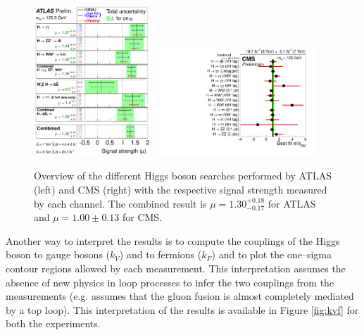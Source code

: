 \begin{figure}
        \centering
	\includegraphics[width=0.39\textwidth]{1_Introduction_Th_and_Exp/pics/fig_01.pdf}
	\includegraphics[width=0.54\textwidth]{1_Introduction_Th_and_Exp/pics/sqr_mlz_ccc_mH125.pdf}
       \caption{Overview of the different Higgs boson searches performed by ATLAS (left) and CMS (right) with the respective signal strength measured by each channel. The combined result is $\mu = 1.30^{+0.18}_{-0.17}$ for ATLAS and $\mu = 1.00 \pm 0.13$ for CMS.}
       \label{fig:combination}
\end{figure}

Another way to interpret the results is to compute the couplings of the Higgs boson to gauge bosons ($k_V$) and to fermions ($k_F$) and to plot the one--sigma contour regions allowed by each measurement. This interpretation assumes the absence of new physics in loop processes to infer the two couplings from the measurements (e.g. assumes that the gluon fusion is almost completely mediated by a top loop). This interpretation of the results is available in Figure \ref{fig:kvf} for both the experiments.

